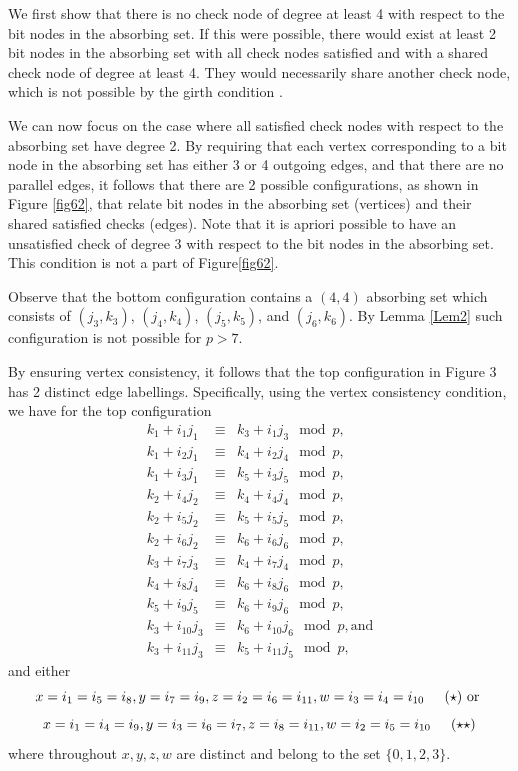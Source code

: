 We first show that there is no check node of degree at least 4
with respect to the bit nodes in the absorbing set. If this were
possible, there would exist at least 2 bit nodes  in the absorbing
set with all check nodes satisfied and with a shared check node of
degree at least 4. They would necessarily share another check
node, which is not possible by the girth condition \cite{fan}.

We can now focus on the case where all satisfied check nodes with
respect to the absorbing set have degree 2. By requiring that each
vertex corresponding to a bit node in the absorbing set has either
3 or 4 outgoing edges, and that there are no parallel edges, it
follows that there are 2 possible configurations, as shown in
Figure \ref{fig62}, that relate bit nodes in the absorbing set
(vertices) and their shared satisfied checks (edges). Note that it
is apriori possible to have an unsatisfied check of degree 3 with
respect to the bit nodes in the absorbing set. This condition is
not a part of Figure\ref{fig62}.

Observe that the bottom configuration contains a $(4,4)$ absorbing
set which consists of $(j_3,k_3)$, $(j_4,k_4)$, $(j_5,k_5)$, and
$(j_6,k_6)$. By Lemma \ref{Lem2} such configuration is not
possible for $p>7$.

 By ensuring vertex consistency, it follows that the top
configuration in Figure 3 has 2 distinct edge labellings.
Specifically, using the vertex consistency condition, we have for
the top configuration
\begin{eqnarray*}
k_1+i_1j_1 &\equiv& k_3+i_1j_3 \mod p, \\
k_1+i_2j_1 &\equiv& k_4+i_2j_4 \mod p, \\
k_1+i_3j_1 &\equiv& k_5+i_3j_5 \mod p, \\
k_2+i_4j_2 &\equiv& k_4+i_4j_4 \mod p, \\
k_2+i_5j_2 &\equiv& k_5+i_5j_5 \mod p, \\
k_2+i_6j_2 &\equiv& k_6+i_6j_6 \mod p, \\
k_3+i_7j_3 &\equiv& k_4+i_7j_4 \mod p, \\
k_4+i_8j_4 &\equiv& k_6+i_8j_6 \mod p, \\
k_5+i_9j_5 &\equiv& k_6+i_9j_6 \mod p, \\
k_3+i_{10}j_3 &\equiv& k_6+i_{10}j_6 \mod p,\text{and} \\
k_3+i_{11}j_3 &\equiv& k_5+i_{11}j_5 \mod p,
\end{eqnarray*}
and either \[x=i_1=i_5=i_8, y=i_7=i_9, z=i_2=i_6=i_{11},
w=i_3=i_4=i_{10} \hspace{0.2in}(\star) \text{ or }\]
\[x=i_1=i_4=i_9, y=i_3=i_6=i_7, z=i_8=i_{11}, w=i_2=i_5=i_{10}
\hspace{0.2in}(\star\star)\] where throughout $x,y,z,w$ are distinct
and belong to the set $\{0,1,2,3\}$.

